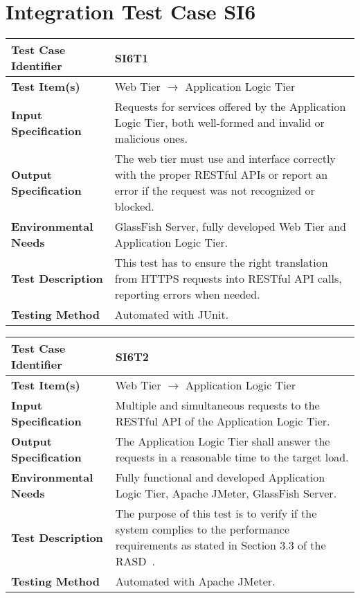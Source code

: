 \newpage
\section{Integration Test Case SI6}

\begin{longtable}{p{} | p{}}
\hline
\textbf{Test Case Identifier} & SI6T1\\
\hline
\textbf{Test Item(s)} & Web Tier $\rightarrow$ Application Logic Tier \\
\hline
\textbf{Input Specification} & Requests for services offered by the Application Logic Tier, both well-formed and invalid or malicious ones. \\
\hline
\textbf{Output Specification} & The web tier must use and interface correctly with the proper RESTful APIs or report an error if the request was not recognized or blocked. \\
\hline
\textbf{Environmental Needs} & GlassFish Server, fully developed Web Tier and Application Logic Tier. \\
\hline
\textbf{Test Description} & This test has to ensure the right translation from HTTPS requests into RESTful API calls, reporting errors when needed. \\
\hline
\textbf{Testing Method} & Automated with JUnit. \\
\hline
\end{longtable}

\begin{longtable}{p{} | p{}}
\hline
\textbf{Test Case Identifier} & SI6T2\\
\hline
\textbf{Test Item(s)} & Web Tier $\rightarrow$ Application Logic Tier \\
\hline
\textbf{Input Specification} & Multiple and simultaneous requests to the RESTful API of the Application Logic Tier. \\
\hline
\textbf{Output Specification} & The Application Logic Tier shall answer the requests in a reasonable time to the target load. \\
\hline
\textbf{Environmental Needs} & Fully functional and developed Application Logic Tier, Apache JMeter, GlassFish Server. \\
\hline
\textbf{Test Description} & The purpose of this test is to verify if the system complies to the performance requirements as stated in Section 3.3 of the RASD~\cite{rasd}. \\
\hline
\textbf{Testing Method} & Automated with Apache JMeter. \\
\hline
\end{longtable}

